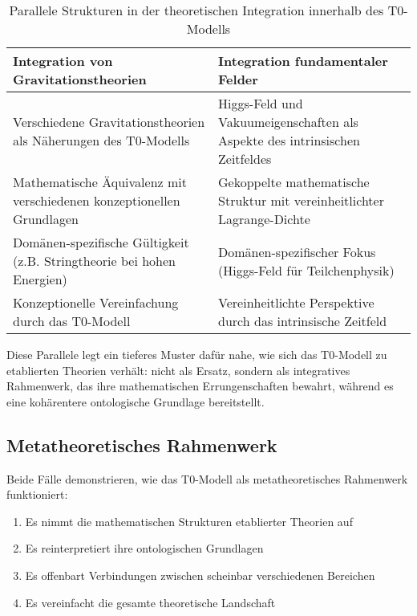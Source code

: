 \documentclass[12pt,a4paper]{article}
\begin{document}
	\begin{table}[h]
		\centering
		\begin{tabular}{|p{}|p{}|}
			\hline
			\textbf{Integration von Gravitationstheorien} & \textbf{Integration fundamentaler Felder} \\
			\hline
			Verschiedene Gravitationstheorien als Näherungen des T0-Modells & Higgs-Feld und Vakuumeigenschaften als Aspekte des intrinsischen Zeitfeldes \\
			\hline
			Mathematische Äquivalenz mit verschiedenen konzeptionellen Grundlagen & Gekoppelte mathematische Struktur mit vereinheitlichter Lagrange-Dichte \\
			\hline
			Domänen-spezifische Gültigkeit (z.B. Stringtheorie bei hohen Energien) & Domänen-spezifischer Fokus (Higgs-Feld für Teilchenphysik) \\
			\hline
			Konzeptionelle Vereinfachung durch das T0-Modell & Vereinheitlichte Perspektive durch das intrinsische Zeitfeld \\
			\hline
		\end{tabular}
		\caption{Parallele Strukturen in der theoretischen Integration innerhalb des T0-Modells}
		\label{tab:parallel_structures}
	\end{table}
	
	Diese Parallele legt ein tieferes Muster dafür nahe, wie sich das T0-Modell zu etablierten Theorien verhält: nicht als Ersatz, sondern als integratives Rahmenwerk, das ihre mathematischen Errungenschaften bewahrt, während es eine kohärentere ontologische Grundlage bereitstellt.
	
	\subsection{Metatheoretisches Rahmenwerk}
	\label{subsec:metatheory}
	
	Beide Fälle demonstrieren, wie das T0-Modell als metatheoretisches Rahmenwerk funktioniert:
	
	\begin{enumerate}
		\item Es nimmt die mathematischen Strukturen etablierter Theorien auf
		\item Es reinterpretiert ihre ontologischen Grundlagen
		\item Es offenbart Verbindungen zwischen scheinbar verschiedenen Bereichen
		\item Es vereinfacht die gesamte theoretische Landschaft
	\end{enumerate}
	
\end{document}

